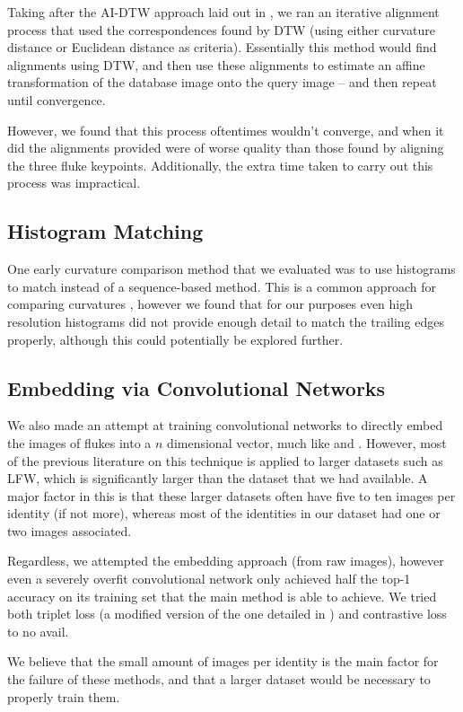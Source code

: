 Taking after the AI-DTW approach laid out in \cite{qiao2006affine}, we ran an iterative alignment process that used the correspondences found by DTW (using either curvature distance or Euclidean distance as criteria).
Essentially this method would find alignments using DTW, and then use these alignments to estimate an affine transformation of the database image onto the query image -- and then repeat until convergence.

However, we found that this process oftentimes wouldn't converge, and when it did the alignments provided were of worse quality than those found by aligning the three fluke keypoints.
Additionally, the extra time taken to carry out this process was impractical.

\subsection{Histogram Matching}

One early curvature comparison method that we evaluated was to use histograms to match instead of a sequence-based method.
This is a common approach for comparing curvatures \cite{kumar2012leafsnap}, however we found that for our purposes even high resolution histograms did not provide enough detail to match the trailing edges properly, although this could potentially be explored further.

\subsection{Embedding via Convolutional Networks}

We also made an attempt at training convolutional networks to directly embed the images of flukes into a $n$ dimensional vector, much like \cite{schroff2015facenet} and \cite{parkhi2015deep}.
However, most of the previous literature on this technique is applied to larger datasets such as LFW\cite{huang2007labeled}, which is significantly larger than the dataset that we had available.
A major factor in this is that these larger datasets often have five to ten images per identity (if not more), whereas most of the identities in our dataset had one or two images associated.

Regardless, we attempted the embedding approach (from raw images), however even a severely overfit convolutional network only achieved half the top-1 accuracy on its training set that the main method is able to achieve.
We tried both triplet loss (a modified version of the one detailed in \cite{schroff2015facenet}) and contrastive loss \cite{hadsell2006dimensionality} to no avail.

We believe that the small amount of images per identity is the main factor for the failure of these methods, and that a larger dataset would be necessary to properly train them.

